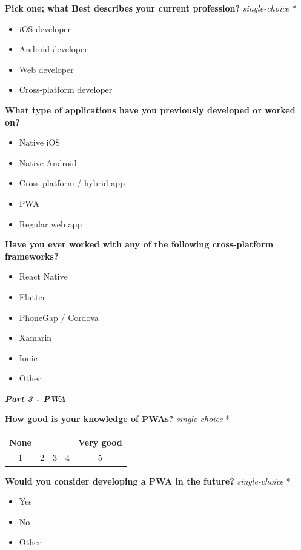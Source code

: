 \documentclass[a4paper,12pt]{article}
\begin{document}
\textbf{Pick one; what Best describes your current profession?} \textit{single-choice} *
\begin{itemize}
    \item iOS developer
    \item Android developer
    \item Web developer
    \item Cross-platform developer
\end{itemize}

\textbf{What type of applications have you previously developed or worked on?}
\begin{itemize}
    \item Native iOS
    \item Native Android
    \item Cross-platform / hybrid app
    \item PWA
    \item Regular web app
\end{itemize}

\textbf{Have you ever worked with any of the following cross-platform frameworks?}
\begin{itemize}
    \item React Native
    \item Flutter
    \item PhoneGap / Cordova
    \item Xamarin
    \item Ionic
    \item Other:
\end{itemize}
\quad

\textbf{\textit{Part 3 - PWA}}

\textbf{How good is your knowledge of PWAs?}  \textit{single-choice} *

\begin{tabular}{ccccc}
    None & & & & Very good \\
    \hline
    \multicolumn{1}{|c|}{1} & \multicolumn{1}{c|}{2} & \multicolumn{1}{c|}{3} & \multicolumn{1}{c|}{4} & \multicolumn{1}{c|}{5} \\
     \hline
\end{tabular}

\quad

\quad

\textbf{Would you consider developing a PWA in the future?} \textit{single-choice} *
\begin{itemize}
    \item Yes
    \item No
    \item Other:
\end{itemize}
\end{document}
